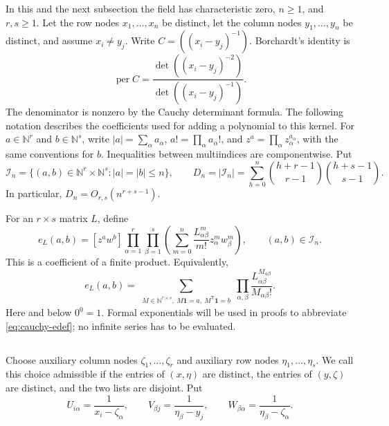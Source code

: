 \documentclass[11pt,reqno]{amsart}
\theoremstyle{remark}
\numberwithin{equation}{section}
\newcommand{\per}{\operatorname{per}}
\newcommand{\calI}{\mathcal I}
\newcommand{\N}{\mathbb N}
\begin{document}
In this and the next subsection the field has characteristic zero,
\(n\geq1\), and \(r,s\geq1\). Let the row nodes
\(x_1,\ldots,x_n\) be distinct, let the column nodes
\(y_1,\ldots,y_n\) be distinct, and assume \(x_i\ne y_j\).
Write \(C=((x_i-y_j)^{-1})\). Borchardt's identity is
\begin{equation}\label{eq:cauchy-borchardt}
 \per C=\frac{\det((x_i-y_j)^{-2})}{\det((x_i-y_j)^{-1})}.
\end{equation}
The denominator is nonzero by the Cauchy determinant formula.
The following notation describes the coefficients used for adding
a polynomial to this kernel.
For $a\in\N^r$ and $b\in\N^s$, write
$|a|=\sum_\alpha a_\alpha$, $a!=\prod_\alpha a_\alpha!$, and
$z^a=\prod_\alpha z_\alpha^{a_\alpha}$, with the same conventions for $b$.
Inequalities between multiindices are componentwise. Put
\begin{equation}\label{eq:cauchy-indexset}
 \calI_n=\{(a,b)\in\N^r\times\N^s:|a|=|b|\leq n\},\qquad
 D_n=|\calI_n|
 =\sum_{h=0}^n\binom{h+r-1}{r-1}\binom{h+s-1}{s-1}.
\end{equation}
In particular, $D_n=O_{r,s}(n^{r+s-1})$.

For an $r\times s$ matrix $L$, define
\begin{equation}\label{eq:cauchy-edef}
 e_L(a,b)=[z^a w^b]
 \prod_{\alpha=1}^r\prod_{\beta=1}^s
 \left(\sum_{m=0}^n\frac{L_{\alpha\beta}^m}{m!}
 z_\alpha^m w_\beta^m\right),\qquad (a,b)\in\calI_n.
\end{equation}
This is a coefficient of a finite product. Equivalently,
\begin{equation}\label{eq:cauchy-etable}
 e_L(a,b)=
 \sum_{\substack{M\in\N^{r\times s}\!,\ M\mathbf1=a\!,\ M^{\mathsf T}\mathbf1=b}}
 \prod_{\alpha,\beta}\frac{L_{\alpha\beta}^{M_{\alpha\beta}}}{M_{\alpha\beta}!}.
\end{equation}
Here and below $0^0=1$. Formal exponentials will be used in proofs
to abbreviate \eqref{eq:cauchy-edef}; no infinite series has to be evaluated.

\subsection{}
Choose auxiliary column nodes $\zeta_1,\ldots,\zeta_r$ and auxiliary
row nodes $\eta_1,\ldots,\eta_s$. We call this choice admissible if
the entries of $(x,\eta)$ are distinct, the entries of $(y,\zeta)$
are distinct, and the two lists are disjoint. Put
\begin{equation}\label{eq:cauchy-uv}
 U_{i\alpha}=\frac1{x_i-\zeta_\alpha},\qquad
 V_{\beta j}=\frac1{\eta_\beta-y_j},\qquad
 W_{\beta\alpha}=\frac1{\eta_\beta-\zeta_\alpha}.
\end{equation}
\end{document}
